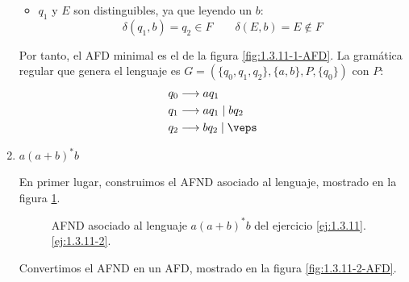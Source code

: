 \begin{ejercicio}
\begin{enumerate}
\begin{itemize}
            \item $q_1$ y $E$ son distinguibles, ya que leyendo un $b$:
            \begin{equation*}
                \delta(q_1,b)=q_2\in F\qquad \delta(E,b)=E\notin F
            \end{equation*}
        \end{itemize}

        Por tanto, el AFD minimal es el de la figura \ref{fig:1.3.11-1-AFD}. La gramática regular que genera el lenguaje es $G=(\{q_0,q_1,q_2\},\{a,b\},P,\{q_0\})$ con $P$:
        \begin{align*}
            q_0 &\longrightarrow aq_1\\
            q_1 &\longrightarrow aq_1\mid bq_2\\
            q_2 &\longrightarrow bq_2\mid \veps
        \end{align*}
        \item \label{ej:1.3.11-2}
        $a{(a+b)}^{\ast}b$
        
        En primer lugar, construimos el AFND asociado al lenguaje, mostrado en la figura \ref{fig:1.3.11-2-AFND}.
        \begin{figure}[H]
            \centering
            \caption{AFND asociado al lenguaje $a{(a+b)}^{\ast}b$ del ejercicio \ref{ej:1.3.11}.\ref{ej:1.3.11-2}.}
            \label{fig:1.3.11-2-AFND}
        \end{figure}

        Convertimos el AFND en un AFD, mostrado en la figura \ref{fig:1.3.11-2-AFD}.
        \begin{figure}[H]
            \centering
\end{figure}
\end{enumerate}
\end{ejercicio}
